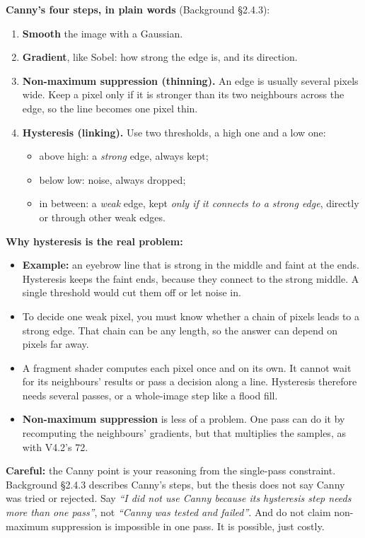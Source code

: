 \documentclass[11pt,a4paper]{article}
\newcommand{\careful}[1]{{\color{knred}\textbf{Careful:} #1}\par}
\begin{document}
\textbf{Canny's four steps, in plain words} (Background §2.4.3):
\begin{enumerate}[leftmargin=1.4em,itemsep=0.1em,topsep=0.2em]
  \item \textbf{Smooth} the image with a Gaussian.
  \item \textbf{Gradient}, like Sobel: how strong the edge is, and its direction.
  \item \textbf{Non-maximum suppression (thinning).} An edge is usually several pixels wide. Keep a pixel only if it is stronger than its two neighbours across the edge, so the line becomes one pixel thin.
  \item \textbf{Hysteresis (linking).} Use two thresholds, a high one and a low one:
  \begin{itemize}[itemsep=0em,topsep=0.1em]
    \item above high: a \emph{strong} edge, always kept;
    \item below low: noise, always dropped;
    \item in between: a \emph{weak} edge, kept \emph{only if it connects to a strong edge}, directly or through other weak edges.
  \end{itemize}
\end{enumerate}

\textbf{Why hysteresis is the real problem:}
\begin{itemize}
  \item \textbf{Example:} an eyebrow line that is strong in the middle and faint at the ends. Hysteresis keeps the faint ends, because they connect to the strong middle. A single threshold would cut them off or let noise in.
  \item To decide one weak pixel, you must know whether a chain of pixels leads to a strong edge. That chain can be any length, so the answer can depend on pixels far away.
  \item A fragment shader computes each pixel once and on its own. It cannot wait for its neighbours' results or pass a decision along a line. Hysteresis therefore needs several passes, or a whole-image step like a flood fill.
  \item \textbf{Non-maximum suppression} is less of a problem. One pass can do it by recomputing the neighbours' gradients, but that multiplies the samples, as with V4.2's 72.
\end{itemize}

\careful{the Canny point is your reasoning from the single-pass constraint. Background §2.4.3 describes Canny's steps, but the thesis does not say Canny was tried or rejected. Say \emph{``I did not use Canny because its hysteresis step needs more than one pass''}, not \emph{``Canny was tested and failed''}. And do not claim non-maximum suppression is impossible in one pass. It is possible, just costly.}
\end{document}
